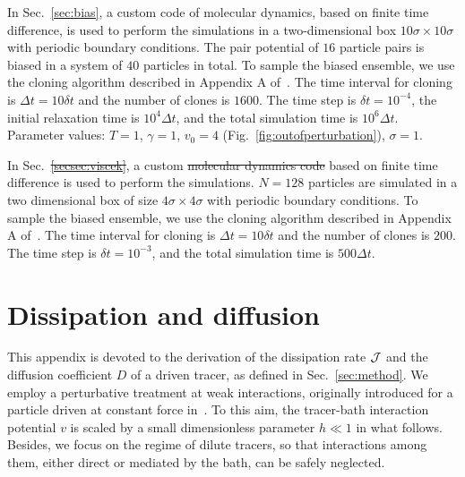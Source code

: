 \documentclass[superscriptaddress, twocolumn, prx, longbibliography, nofootinbib]{revtex4-1}
\providecommand{\DIFaddtex}[1]{{\protect\color{blue}\uwave{#1}}} %
\providecommand{\DIFdeltex}[1]{{\protect\color{red}\sout{#1}}}                      %
\providecommand{\DIFaddbegin}{} %
\providecommand{\DIFaddend}{} %
\providecommand{\DIFdelbegin}{} %
\providecommand{\DIFdelend}{} %
\providecommand{\DIFadd}[1]{\texorpdfstring{\DIFaddtex{#1}}{#1}} %
\providecommand{\DIFdel}[1]{\texorpdfstring{\DIFdeltex{#1}}{}} %
\begin{document}
In Sec.~\ref{sec:bias}, a custom code of molecular dynamics, based on finite time difference, is used to perform the simulations in a two-dimensional box $10\sigma\times 10\sigma$ with periodic boundary conditions. The pair potential of $16$ particle pairs is biased in a system of $40$ particles in total. To sample the biased ensemble, we use the cloning algorithm described in Appendix A of~\cite{Nemoto2016}. The time interval for cloning is $\Delta t = 10 \delta t$ and the number of clones is $1600$. The time step is $\delta t = 10^{-4}$, the initial relaxation time is $10^4\Delta t$, and the total simulation time is $10^6 \Delta t$. Parameter values: $T=1$, $\gamma=1$, $v_0=4$ (Fig.~\ref{fig:outofperturbation}), $\sigma=1$.

In Sec.~\DIFdelbegin \DIFdel{\ref{secsec:viscek}}\DIFdelend \DIFaddbegin \DIFadd{\ref{sec:vicsek}}\DIFaddend , a custom \DIFdelbegin \DIFdel{molecular dynamics code }\DIFdelend \DIFaddbegin \DIFadd{code of molecular dynamics }\DIFaddend based on finite time difference is used to perform the simulations. $N=128$ particles are simulated in a two dimensional box of size $4\sigma\times 4\sigma$ with periodic boundary conditions. To sample the biased ensemble, we use the cloning algorithm described in Appendix A of~\cite{Nemoto2016}. The time interval for cloning is $\Delta t = 10 \delta t$ and the number of clones is $200$. The time step is $\delta t = 10^{-3}$, and the total simulation time is $500 \Delta t$. 




\section{Dissipation and diffusion}\label{app:diff}

This appendix is devoted to the derivation of the dissipation rate $\cal J$ and the diffusion coefficient $D$ of a driven tracer, as defined in Sec.~\ref{sec:method}. We employ a perturbative treatment at weak interactions, originally introduced for a particle driven at constant force in~\cite{Demery2011, Demery2014}. To this aim, the tracer-bath interaction potential $v$ is scaled by a small dimensionless parameter $h\ll1$ in what follows. Besides, we focus on the regime of dilute tracers, so that interactions among them, either direct or mediated by the bath, can be safely neglected.
\end{document}
